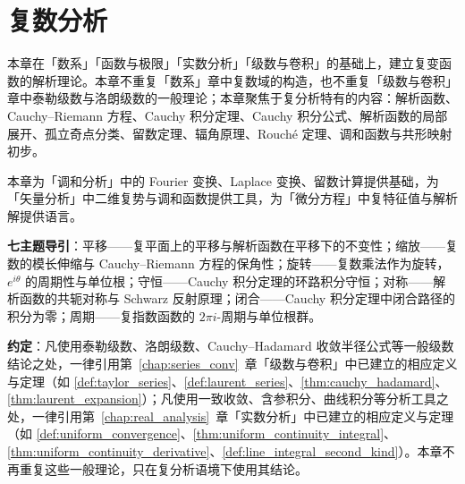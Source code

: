 \chapter{复数分析}
\label{chap:complex_analysis}

\begin{remark}[本章定位]\label{rem:complex_analysis_positioning}
本章在「数系」「函数与极限」「实数分析」「级数与卷积」的基础上，建立复变函数的解析理论。本章不重复「数系」章中复数域的构造，也不重复「级数与卷积」章中泰勒级数与洛朗级数的一般理论；本章聚焦于复分析特有的内容：解析函数、Cauchy--Riemann 方程、Cauchy 积分定理、Cauchy 积分公式、解析函数的局部展开、孤立奇点分类、留数定理、辐角原理、Rouché 定理、调和函数与共形映射初步。

本章为「调和分析」中的 Fourier 变换、Laplace 变换、留数计算提供基础，为「矢量分析」中二维复势与调和函数提供工具，为「微分方程」中复特征值与解析解提供语言。

\textbf{七主题导引}：平移——复平面上的平移与解析函数在平移下的不变性；缩放——复数的模长伸缩与 Cauchy--Riemann 方程的保角性；旋转——复数乘法作为旋转，$e^{i\theta}$ 的周期性与单位根；守恒——Cauchy 积分定理的环路积分守恒；对称——解析函数的共轭对称与 Schwarz 反射原理；闭合——Cauchy 积分定理中闭合路径的积分为零；周期——复指数函数的 $2\pi i$-周期与单位根群。

\textbf{约定}：凡使用泰勒级数、洛朗级数、Cauchy--Hadamard 收敛半径公式等一般级数结论之处，一律引用第~\ref{chap:series_conv}~章「级数与卷积」中已建立的相应定义与定理（如 \cref{def:taylor_series}、\cref{def:laurent_series}、\cref{thm:cauchy_hadamard}、\cref{thm:laurent_expansion}）；凡使用一致收敛、含参积分、曲线积分等分析工具之处，一律引用第~\ref{chap:real_analysis}~章「实数分析」中已建立的相应定义与定理（如 \cref{def:uniform_convergence}、\cref{thm:uniform_continuity_integral}、\cref{thm:uniform_continuity_derivative}、\cref{def:line_integral_second_kind}）。本章不再重复这些一般理论，只在复分析语境下使用其结论。
\end{remark}

